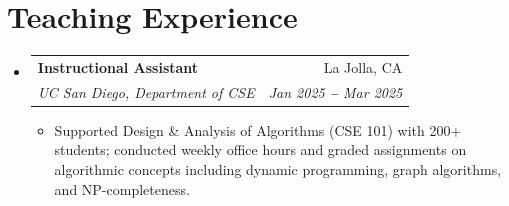 \documentclass[letterpaper,11pt]{article}
\makeatletter
\newcommand{\resumeItem}[1]{
  \item\small{
    {#1 \vspace{-1pt}}
  }
}
\newcommand{\resumeSubheading}[4]{
  \vspace{-2pt}\item
    \begin{tabular*}{0.97\textwidth}[t]{l@{\extracolsep{\fill}}r}
      \textbf{#1} & #2 \\
      \textit{\small#3} & \textit{\small #4} \\
    \end{tabular*}\vspace{-2pt}
}
\newcommand{\resumeSubHeadingListStart}{\begin{itemize}[leftmargin=0.15in, label={}]}
\newcommand{\resumeSubHeadingListEnd}{\end{itemize}}
\newcommand{\resumeItemListStart}{\begin{itemize}\vspace{-2pt}}
\newcommand{\resumeItemListEnd}{\end{itemize}\vspace{-7pt}}
\makeatother
\begin{document}

\section{Teaching Experience}
\resumeSubHeadingListStart
  \resumeSubheading
    {Instructional Assistant}{La Jolla, CA}
    {UC San Diego, Department of CSE}{Jan 2025 \textbf{--} Mar 2025}
    \resumeItemListStart
      \resumeItem{Supported Design \& Analysis of Algorithms (CSE 101) with 200+ students; conducted weekly office hours and graded assignments on algorithmic concepts including dynamic programming, graph algorithms, and NP-completeness.}
    \resumeItemListEnd
\resumeSubHeadingListEnd
\end{document}

